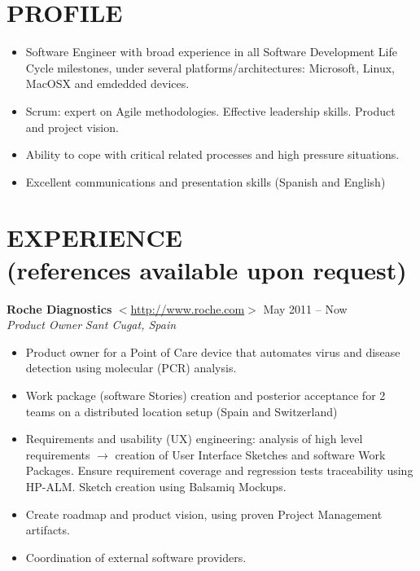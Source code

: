 \documentclass[line,margin]{res}
\begin{document}
\address{+34 678714822 / roberlamerma@gmail.com}

\begin{resume}
 
\section{PROFILE}       
                \begin{itemize}  \itemsep 2pt 
                \item Software Engineer with broad experience in all Software 
                Development Life Cycle milestones, under several platforms/architectures: Microsoft, Linux, MacOSX and emdedded devices.
                \item Scrum: expert on Agile methodologies. Effective leadership skills. Product and project vision.
                \item Ability to cope with critical related processes and high 
                pressure situations.              
                \item Excellent communications and presentation skills (Spanish and English)
                \end{itemize}
         

\section{EXPERIENCE \\ \footnotesize{(references available upon request)}}

                \textbf{Roche Diagnostics} 
                $<$\url{http://www.roche.com}$>$ \hfill May 2011 -- Now \\
                {\sl Product Owner} \hfill \textit{Sant Cugat, Spain}
                \begin{itemize}  \itemsep 2pt 
                \item Product owner for a Point of Care device that automates virus and disease detection using molecular (PCR) analysis.
                \item Work package (software Stories) creation and posterior acceptance for 2 teams on a distributed location setup (Spain and Switzerland)
                \item Requirements and usability (UX) engineering: analysis of high level requirements $\rightarrow$ creation of User Interface Sketches and 
                software Work Packages. Ensure requirement coverage and regression tests traceability using HP-ALM. Sketch creation using Balsamiq Mockups.
                \item Create roadmap and product vision, using proven Project Management artifacts.
                \item Coordination of external software providers.
                \end{itemize}


\end{resume}
\end{document}
